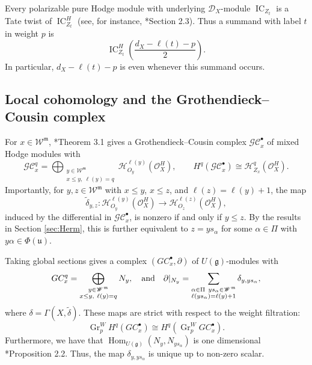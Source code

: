 \documentclass[12pt]{amsart}
\theoremstyle{definition}
\numberwithin{equation}{section}
\newcommand{\g}{\mathfrak g}
\newcommand{\m}{\mathfrak m}
\newcommand{\W}{\mathscr W}
\begin{document}
Every polarizable pure Hodge module with underlying $\mathscr D_X$-module
$\operatorname{IC}_{Z_t}$ is a Tate twist of
$\operatorname{IC}_{Z_t}^H$ (see, for instance, \cite{PRdet}*{Section 2.3}).
Thus a summand with label $t$ in weight $p$ is
\[
\operatorname{IC}_{Z_t}^H
\left(\frac{d_X-\ell(t)-p}{2}\right).
\]
In particular, $d_X-\ell(t)-p$ is even whenever this summand occurs.





\subsection{Local cohomology and the Grothendieck--Cousin complex}
\label{subsec:am-geometric-conventions}





For $x\in\W^{\m}$, \cite{schubertLC}*{Theorem 3.1} gives a
Grothendieck--Cousin complex $\mathscr{GC}_x^{\bullet}$ of mixed Hodge modules with
\begin{equation}\label{eq:lc-cousin-terms}
\mathscr{GC}_x^q
=\bigoplus_{\substack{y\in\W^{\m}\\ x\leq y,\ \ell(y)=q}}
\mathscr{H}^{\ell(y)}_{O_y}(\mathscr{O}_X^H),
\qquad
H^q(\mathscr{GC}_x^\bullet)
\cong\mathscr H^q_{Z_x}(\mathscr O_X^H).
\end{equation}
Importantly, for $y,z\in \W^{\m}$ with $x\leq y$, $x\leq z$, and $\ell(z)=\ell(y)+1$, the map
\begin{equation}
\tilde{\delta}_{y,z}: \mathscr{H}^{\ell(y)}_{O_y}(\mathscr{O}_X^H) \to \mathscr{H}^{\ell(z)}_{O_z}(\mathscr{O}_X^H),   
\end{equation}
induced by the differential in $\mathscr{GC}_x^{\bullet}$, is nonzero if and only if $y\leq z$. By the results in Section \ref{sec:Herm}, this is further equivalent to $z=ys_{\alpha}$ for some $\alpha\in \Pi$ with $y\alpha\in \Phi(\mathfrak{u})$.

Taking global sections gives a complex $(GC^{\bullet}_{x},\partial)$ of $U(\g)$-modules with
\begin{equation}
GC_x^q
=\bigoplus_{\substack{y\in\W^{\m}\\ x\leq y,\ \ell(y)=q}} N_y,\quad \textnormal{and}\quad\partial|_{N_y}=\sum_{\substack{\alpha\in \Pi\,\; ys_{\alpha}\in \W^{\m}\\ \ell(ys_{\alpha})=\ell(y)+1}} \delta_{y,ys_{\alpha}},   
\end{equation}
where $\delta=\Gamma(X,\tilde{\delta})$. These maps are strict with respect to the weight filtration:
\begin{equation}\label{eq:lc-strictness}
\operatorname{Gr}^W_p H^q(GC^{\bullet}_{x})
\cong
H^q\!\left(
  \operatorname{Gr}^W_p GC_x^\bullet
\right).
\end{equation}
Furthermore, we have that $\operatorname{Hom}_{U(\g)}(N_y,N_{ys_{\alpha}})$ is one dimensional \cite{intertwining}*{Proposition 2.2}. Thus, the map $\delta_{y,ys_{\alpha}}$ is unique up to non-zero scalar.
\end{document}
